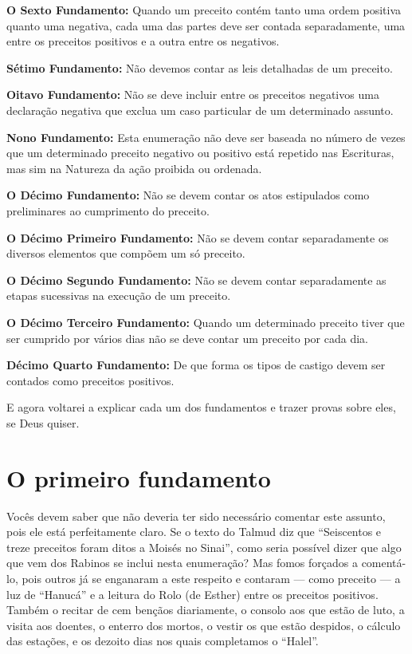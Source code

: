\textbf{O Sexto Fundamento:} Quando um preceito contém tanto uma ordem
positiva quanto uma negativa, cada uma das partes deve ser contada
separadamente, uma entre os preceitos positivos e a outra entre os
negativos.


\textbf{Sétimo Fundamento:} Não devemos contar as leis detalhadas de
um preceito.


\textbf{Oitavo Fundamento:} Não se deve incluir entre os preceitos
negativos uma declaração negativa que exclua um caso particular de um
determinado assunto.


\textbf{Nono Fundamento:} Esta enumeração não deve ser baseada no
número de vezes que um determinado preceito negativo ou positivo está
repetido nas Escrituras, mas sim na Natureza da ação proibida ou
ordenada.


\textbf{O Décimo Fundamento:} Não se devem contar os atos estipulados
como preliminares ao cumprimento do preceito.

\textbf{O Décimo Primeiro Fundamento:} Não se devem contar separadamente
os diversos elementos que compõem um só preceito.

\textbf{O Décimo Segundo Fundamento:} Não se devem contar separadamente
as etapas sucessivas na execução de um preceito.

\textbf{O Décimo Terceiro Fundamento:} Quando um determinado preceito
tiver que ser cumprido por vários dias não se deve contar um preceito
por cada dia.


\textbf{Décimo Quarto Fundamento:} De que forma os tipos de castigo
devem ser contados como preceitos positivos.


E agora voltarei a explicar cada um dos fundamentos e trazer provas
sobre eles, se Deus quiser.

\chapter*{O primeiro fundamento}

Vocês devem saber que não deveria ter sido necessário comentar este
assunto, pois ele está perfeitamente claro. Se o texto do Talmud diz que
``Seiscentos e treze preceitos foram ditos a Moisés no Sinai'', como
seria possível dizer que algo que vem dos Rabinos se inclui nesta
enumeração? Mas fomos forçados a comentá-lo, pois outros já se enganaram
a este respeito e contaram --- como preceito --- a luz de ``Hanucá'' e
a leitura do Rolo (de Esther) entre os preceitos positivos. Também o
recitar de cem bençãos diariamente, o consolo aos que estão de luto, a
visita aos doentes, o enterro dos mortos, o vestir os que estão
despidos, o cálculo das estações, e os dezoito dias nos quais
completamos o ``Halel''.

